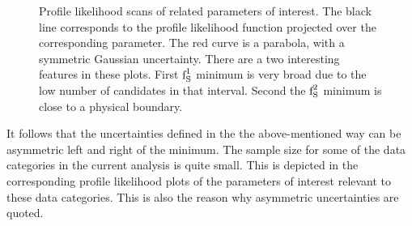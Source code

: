 \begin{figure}[!t]
  \centering
  \begin{subfigure}{0.5\textwidth}
    \raggedright
    \scalebox{0.56}{}
    \caption{}
    \label{nll_ASMag2_bin1}
  \end{subfigure}%
  \hfill%
  \begin{subfigure}{0.5\textwidth}
    \raggedleft
    \scalebox{0.56}{}
    \caption{}
    \label{nll_ASPhase_bin1}
  \end{subfigure}
  \begin{subfigure}{0.5\textwidth}
    \raggedright
    \scalebox{0.56}{}
    \caption{}
    \label{nll_ASMag2_bin2}
  \end{subfigure}%
  \hfill%
  \begin{subfigure}{0.5\textwidth}
    \raggedleft
    \scalebox{0.56}{}
    \caption{}
    \label{nll_ASPhase_bin2}
  \end{subfigure}
  \caption{Profile likelihood scans of \swave related parameters of interest. The black line corresponds to the profile likelihood
         function projected over the corresponding parameter. The red curve is a parabola, with a symmetric Gaussian
         uncertainty. There are a two interesting features in these plots. First $\text{f}_{\text{S}}^{1}$ minimum is very broad due to the
         low number of candidates in that \mkpi interval. Second the $\text{f}_{\text{S}}^{2}$ minimum is close to a physical boundary.}
\end{figure}

It follows that the uncertainties defined in the the above-mentioned way can be asymmetric
left and right of the minimum. The sample size for some of the data categories in the current
analysis is quite small. This is depicted in the corresponding profile likelihood plots of the
parameters of interest relevant to these data categories. This is also the reason why asymmetric
uncertainties are quoted.

